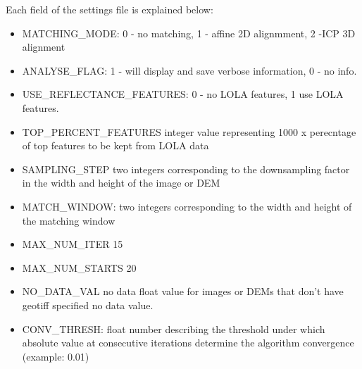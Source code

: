 \documentclass[12pt]{article}
\begin{document}
Each field of the settings file is explained below:
\begin{itemize}
\item{MATCHING\_MODE}: 0 - no matching, 1 - affine 2D alignmment, 2 -ICP 3D alignment\\
\item{ANALYSE\_FLAG}:  1 - will display and save verbose information, 0 - no info.\\
\item{USE\_REFLECTANCE\_FEATURES}: 0 - no LOLA features, 1 use LOLA features.\\ 
\item{TOP\_PERCENT\_FEATURES} integer value representing 1000 x perecntage of top features to be kept from LOLA data\\
\item{SAMPLING\_STEP} two integers corresponding to the downsampling factor in the width and height of the image or DEM\\
\item{MATCH\_WINDOW}: two integers corresponding to the width and height of the matching window\\
\item{MAX\_NUM\_ITER} 15\\
\item{MAX\_NUM\_STARTS} 20\\
\item{NO\_DATA\_VAL} no data float value for images or DEMs that don't have geotiff specified no data value.\\
\item{CONV\_THRESH}: float number describing the threshold under which absolute value at consecutive iterations determine 
                                the algorithm convergence (example: 0.01)\\
\end{itemize}


\end{document}
